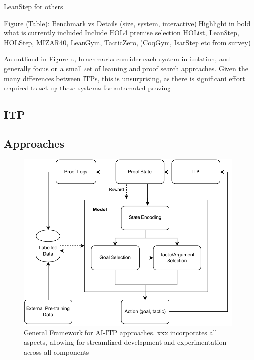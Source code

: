 \documentclass[letterpaper]{article} %
\begin{document}
    LeanStep for others

    Figure (Table):
    Benchmark vs Details (size, system, interactive)
    Highlight in bold what is currently included
    Include HOL4 premise selection
    HOList, LeanStep, HOLStep, MIZAR40, LeanGym, TacticZero, (CoqGym, IsarStep etc from survey)

    As outlined in Figure x, benchmarks consider each system in isolation, and generally focus on a small set of
    learning and proof search approaches.
    Given the many differences between ITPs, this is unsurprising, as there is significant effort required to set
    up these systems for automated proving.

%
%
    \subsection{ITP}

    \subsection{Approaches}
    \begin{figure}[h]
        \centering
        \includegraphics[width=\linewidth]{AI-ITP}
        \caption{General Framework for AI-ITP approaches. xxx incorporates all aspects, allowing for streamlined development and experimentation across all components}
        \label{fig:ai-itp}
    \end{figure}
\end{document}
